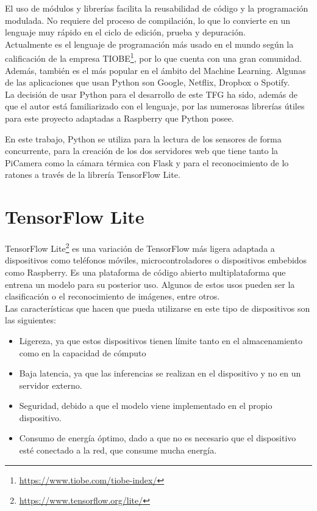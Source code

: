El uso de módulos y librerías facilita la reusabilidad de código y la programación modulada. No requiere del proceso de compilación, lo que lo convierte en un lenguaje muy rápido en el ciclo de edición, prueba y depuración.\\

Actualmente es el lenguaje de programación más usado en el mundo según la calificación de la empresa TIOBE\footnote{\url{https://www.tiobe.com/tiobe-index/}}, por lo que cuenta con una gran comunidad. Además, también es el más popular en el ámbito del Machine Learning. Algunas de las aplicaciones que usan Python son Google, Netflix, Dropbox o Spotify.\\

La decisión de usar Python para el desarrollo de este TFG ha sido, además de que el autor está familiarizado con el lenguaje, por las numerosas librerías útiles para este proyecto adaptadas a Raspberry que Python posee.

En este trabajo, Python se utiliza para la lectura de los sensores de forma concurrente, para la creación de los dos servidores web que tiene tanto la PiCamera como la cámara térmica con Flask y para el reconocimiento de lo ratones a través de la librería TensorFlow Lite.\\

\section{TensorFlow Lite}
\label{sec:tensor}
TensorFlow Lite\footnote{\url{https://www.tensorflow.org/lite/}} es una variación de TensorFlow más ligera adaptada a dispositivos como teléfonos móviles, microcontroladores o dispositivos embebidos como Raspberry. Es una plataforma de código abierto multiplataforma que entrena un modelo para su posterior uso. Algunos de estos usos pueden ser la clasificación o el reconocimiento de imágenes, entre otros.\\

Las características que hacen que pueda utilizarse en este tipo de dispositivos son las siguientes:
\begin{itemize}
\item{Ligereza}, ya que estos dispositivos tienen límite tanto en el almacenamiento como en la capacidad de cómputo
\item{Baja latencia}, ya que las inferencias se realizan en el dispositivo y no en un servidor externo. 
\item{Seguridad}, debido a que el modelo viene implementado en el propio dispositivo.
\item{Consumo de energía óptimo,} dado a que no es necesario que el dispositivo esté conectado a la red, que consume mucha energía.
\end{itemize}

